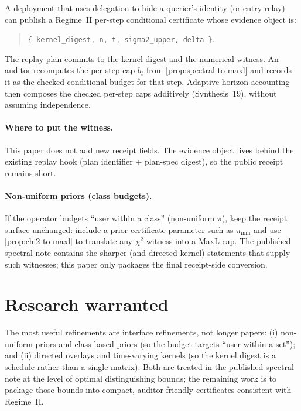 \documentclass[11pt]{article}
\begin{document}
A deployment that uses delegation to hide a querier's identity (or entry relay) can publish a Regime~II per-step conditional certificate whose evidence object is:

\begin{quote}\small
\texttt{\{ kernel\_digest, n, t, sigma2\_upper, delta \}}.
\end{quote}

The replay plan commits to the kernel digest and the numerical witness.
An auditor recomputes the per-step cap $b_t$ from \cref{prop:spectral-to-maxl} and records it as the checked conditional budget for that step.
Adaptive horizon accounting then composes the checked per-step caps additively (Synthesis~19), without assuming independence.\cite{series:accountingrulebook,series:condcert}

\paragraph{Where to put the witness.}
This paper does not add new receipt fields.
The evidence object lives behind the existing replay hook (plan identifier + plan-spec digest), so the public receipt remains short.\cite{series:auditorreplay}

\paragraph{Non-uniform priors (class budgets).}
If the operator budgets ``user within a class'' (non-uniform $\pi$), keep the receipt surface unchanged: include a prior certificate parameter such as $\pi_{\min}$ and use \cref{prop:chi2-to-maxl} to translate any $\chi^2$ witness into a MaxL cap.
The published spectral note contains the sharper (and directed-kernel) statements that supply such witnesses; this paper only packages the final receipt-side conversion.\cite{series:spectral}


\section{Research warranted}
The most useful refinements are interface refinements, not longer papers:
(i) non-uniform priors and class-based priors (so the budget targets ``user within a set''); and
(ii) directed overlays and time-varying kernels (so the kernel digest is a schedule rather than a single matrix).
Both are treated in the published spectral note at the level of optimal distinguishing bounds;\cite{series:spectral}
the remaining work is to package those bounds into compact, auditor-friendly certificates consistent with Regime~II.
\end{document}
